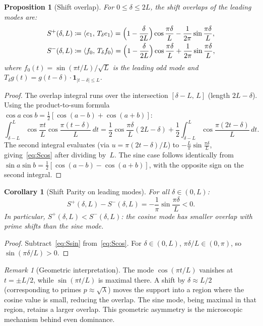 \documentclass[12pt,a4paper]{article}
\newtheorem{proposition}[theorem]{Proposition}
\newtheorem{corollary}[theorem]{Corollary}
\theoremstyle{definition}
\theoremstyle{remark}
\newtheorem{remark}[theorem]{Remark}
\begin{document}
\begin{proposition}[Shift overlap]
\label{prop:overlap-closed}
For $0 \leq \delta \leq 2L$, the shift overlaps of the leading modes are:
\begin{align}
  S^+(\delta, L) &\coloneqq \langle e_1,\, T_\delta e_1\rangle = \Bigl(1 - \frac{\delta}{2L}\Bigr)\cos\frac{\pi\delta}{L} - \frac{1}{2\pi}\sin\frac{\pi\delta}{L}, \label{eq:Scos} \\
  S^-(\delta, L) &\coloneqq \langle f_0,\, T_\delta f_0\rangle = \Bigl(1 - \frac{\delta}{2L}\Bigr)\cos\frac{\pi\delta}{L} + \frac{1}{2\pi}\sin\frac{\pi\delta}{L}, \label{eq:Ssin}
\end{align}
where $f_0(t) = \sin(\pi t/L)/\sqrt{L}$ is the leading odd mode and $T_\delta g(t) = g(t - \delta)\cdot\mathbf{1}_{|t-\delta|\leq L}$.
\end{proposition}

\begin{proof}
The overlap integral runs over the intersection $[\delta - L,\,L]$ (length $2L - \delta$). Using the product-to-sum formula $\cos a\cos b = \tfrac{1}{2}[\cos(a-b) + \cos(a+b)]$:
\[
  \int_{\delta-L}^{L} \cos\frac{\pi t}{L}\cos\frac{\pi(t-\delta)}{L}\,dt
  = \frac{1}{2}\cos\frac{\pi\delta}{L}(2L - \delta) + \frac{1}{2}\int_{\delta-L}^{L}\cos\frac{\pi(2t-\delta)}{L}\,dt.
\]
The second integral evaluates (via $u = \pi(2t-\delta)/L$) to $-\frac{L}{\pi}\sin\frac{\pi\delta}{L}$, giving~\eqref{eq:Scos} after dividing by~$L$. The sine case follows identically from $\sin a\sin b = \tfrac{1}{2}[\cos(a-b) - \cos(a+b)]$, with the opposite sign on the second integral.
\end{proof}

\begin{corollary}[Shift Parity on leading modes]
\label{cor:diagonal-parity}
For all $\delta \in (0, L)$:
\begin{equation}
\label{eq:parity-diff}
  S^+(\delta, L) - S^-(\delta, L) = -\frac{1}{\pi}\sin\frac{\pi\delta}{L} < 0.
\end{equation}
In particular, $S^+(\delta, L) < S^-(\delta, L)$: the cosine mode has \emph{smaller} overlap with prime shifts than the sine mode.
\end{corollary}

\begin{proof}
Subtract~\eqref{eq:Ssin} from~\eqref{eq:Scos}. For $\delta \in (0, L)$, $\pi\delta/L \in (0, \pi)$, so $\sin(\pi\delta/L) > 0$.
\end{proof}

\begin{remark}[Geometric interpretation]
The mode $\cos(\pi t/L)$ vanishes at $t = \pm L/2$, while $\sin(\pi t/L)$ is maximal there. A shift by $\delta \approx L/2$ (corresponding to primes $p \approx \sqrt{\lambda}$) moves the support into a region where the cosine value is small, reducing the overlap. The sine mode, being maximal in that region, retains a larger overlap. This geometric asymmetry is the microscopic mechanism behind even dominance.
\end{remark}
\end{document}
